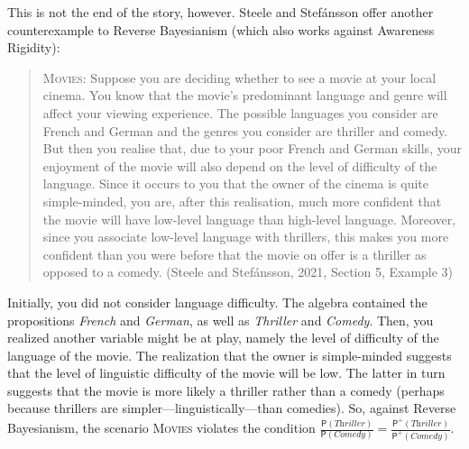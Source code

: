 \documentclass[
  11pt,
  dvipsnames,enabledeprecatedfontcommands]{scrartcl}
\newcommand{\pr}[1]{\ensuremath{\mathsf{P}(#1)}}
\newcommand{\ppr}[2]{\ensuremath{\mathsf{P}^{#1}(#2)}}
\begin{document}
This is not the end of the story, however. Steele and Stefánsson offer
another counterexample to Reverse Bayesianism (which also works against
Awareness Rigidity):

\begin{quote}
\textsc{Movies}: Suppose you are deciding whether to see a movie at your
local cinema. You know that the movie's predominant language and genre
will affect your viewing experience. The possible languages you consider
are French and German and the genres you consider are thriller and
comedy. But then you realise that, due to your poor French and German
skills, your enjoyment of the movie will also depend on the level of
difficulty of the language. Since it occurs to you that the owner of the
cinema is quite simple-minded, you are, after this realisation, much
more confident that the movie will have low-level language than
high-level language. Moreover, since you associate low-level language
with thrillers, this makes you more confident than you were before that
the movie on offer is a thriller as opposed to a comedy. (Steele and
Stefánsson, 2021, Section 5, Example 3)
\end{quote}

\noindent Initially, you did not consider language difficulty. The
algebra contained the propositions \textit{French} and \textit{German},
as well as \textit{Thriller} and \textit{Comedy}. Then, you realized
another variable might be at play, namely the level of difficulty of the
language of the movie. The realization that the owner is simple-minded
suggests that the level of linguistic difficulty of the movie will be
low. The latter in turn suggests that the movie is more likely a
thriller rather than a comedy (perhaps because thrillers are
simpler---linguistically---than comedies). So, against Reverse
Bayesianism, the scenario \textsc{Movies} violates the condition
\(\frac{\pr{\textit{Thriller}}}{\pr{\textit{Comedy}}}=\frac{\ppr{+}{\textit{Thriller}}}{\ppr{+}{\textit{Comedy}}}\).
\end{document}
